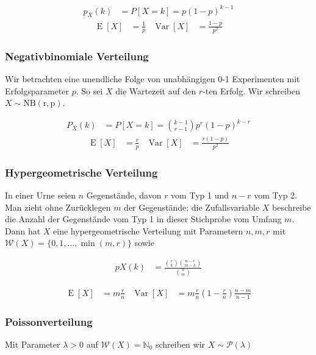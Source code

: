\documentclass[25pt]{sciposter}
\newcommand{\N}{\mathbb{N}}
\newcommand{\W}{\mathcal{W}}
\newcommand{\Var}{\operatorname{Var}}
\newcommand{\E}{\operatorname{E}}
\begin{document}
\begin{multicols}{3}
\begin{align*}
	p_X(k) &= P[X=k] = p(1-p)^{k-1}
\end{align*}
\begin{align*}
	\E[X] &= \frac{1}{p} & \Var[X] &= \frac{1-p}{p^2}
\end{align*}


\subsubsection*{Negativbinomiale Verteilung}
Wir betrachten eine unendliche Folge von unabhängigen 0-1 Experimenten mit Erfolgsparameter $p$. So sei $X$ die Wartezeit auf den $r$-ten Erfolg. Wir schreiben $X\sim \operatorname{NB(r,p)}$.

\begin{align*}
	P_X(k) &= P[X = k] = {k-1 \choose r-1} p^r(1-p)^{k-r}
\end{align*}
\begin{align*}
\E[X] &= \frac{r}{p} & \Var[X] &= \frac{r(1-p)}{p^2}
\end{align*}

\subsubsection*{Hypergeometrische Verteilung}
In einer Urne seien $n$ Gegenstände, davon $r$ vom Typ 1 und $n-r$ vom Typ 2. Man
zieht ohne Zurücklegen $m$ der Gegenstände; die Zufallsvariable $X$ beschreibe die Anzahl
der Gegenstände vom Typ 1 in dieser Stichprobe vom Umfang $m$. Dann hat $X$ eine
hypergeometrische Verteilung mit Parametern $n,m,r$ mit $\W(X) = \{0, 1, \ldots, \min(m, r)\}$ sowie

\begin{align*}
	pX(k) &= \frac{{r\choose k} {n-r \choose m-k}}{{n \choose m}}
\end{align*}

\begin{align*}
\E[X] &= m\frac{r}{n} & \Var[X] &= m\frac{r}{n}\left(1-\frac{r}{n}\right) \frac{n-m}{n-1}
\end{align*}



\subsubsection*{Poissonverteilung}

Mit Parameter $\lambda>0$ auf $\W(X) = \N_0$ schreiben wir $X\sim \mathcal{P}(\lambda)$


\end{multicols}
\end{document}
